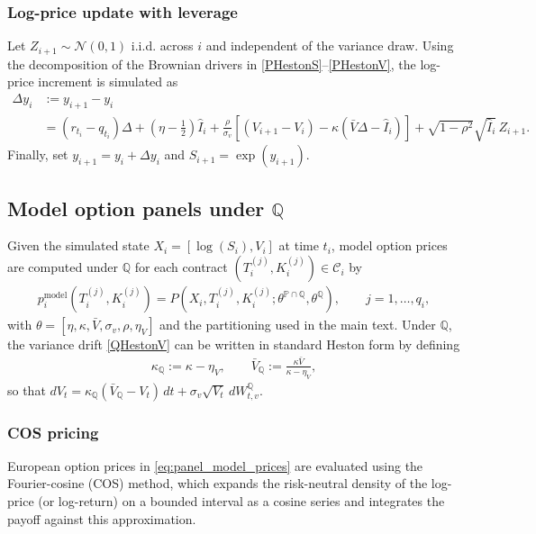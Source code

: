 \documentclass[11pt,a4paper,notitlepage]{article}
\numberwithin{equation}{section}
\begin{document}
\subsubsection{Log-price update with leverage}
Let $Z_{i+1}\sim\mathcal{N}(0,1)$ i.i.d. across $i$ and independent of the variance draw.
Using the decomposition of the Brownian drivers in \eqref{PHestonS}--\eqref{PHestonV},
the log-price increment is simulated as
\begin{align}
\Delta y_i
&:= y_{i+1}-y_i \nonumber\\
&= (r_{t_i}-q_{t_i})\Delta
+ \left(\eta-\frac{1}{2}\right)\widehat{I}_i
+ \frac{\rho}{\sigma_v}\left[\left(V_{i+1}-V_i\right)-\kappa\left(\bar{V}\Delta-\widehat{I}_i\right)\right]
+ \sqrt{1-\rho^2}\sqrt{\widehat{I}_i}\,Z_{i+1}.
\label{eq:logS_update}
\end{align}
Finally, set $y_{i+1}=y_i+\Delta y_i$ and $S_{i+1}=\exp(y_{i+1})$.

\subsection{Model option panels under $\mathbb{Q}$}
Given the simulated state $X_i=[\log(S_i),V_i]$ at time $t_i$, model option prices are computed under
$\mathbb{Q}$ for each contract $(T_i^{(j)},K_i^{(j)})\in\mathcal{C}_i$ by
\begin{align}
p_{i}^{\mathrm{model}}(T_i^{(j)},K_i^{(j)})
= P\!\left(X_i,T_i^{(j)},K_i^{(j)};\theta^{\mathbb{P}\cap\mathbb{Q}},\theta^{\mathbb{Q}}\right),
\qquad j=1,\dots,q_i,
\label{eq:panel_model_prices}
\end{align}
with $\theta=[\eta,\kappa,\bar V,\sigma_v,\rho,\eta_V]$ and the partitioning used in the main text.
Under $\mathbb{Q}$, the variance drift \eqref{QHestonV} can be written in standard Heston form by defining
\begin{align}
\kappa_{\mathbb{Q}} := \kappa-\eta_V,
\qquad
\bar V_{\mathbb{Q}} := \frac{\kappa\bar V}{\kappa-\eta_V},
\end{align}
so that $dV_t=\kappa_{\mathbb{Q}}(\bar V_{\mathbb{Q}}-V_t)\,dt+\sigma_v\sqrt{V_t}\,dW^{\mathbb{Q}}_{t,v}$.

\subsubsection{COS pricing}
European option prices in \eqref{eq:panel_model_prices} are evaluated using the Fourier-cosine (COS)
method, which expands the risk-neutral density of the log-price (or log-return) on a bounded interval
as a cosine series and integrates the payoff against this approximation.
\end{document}
